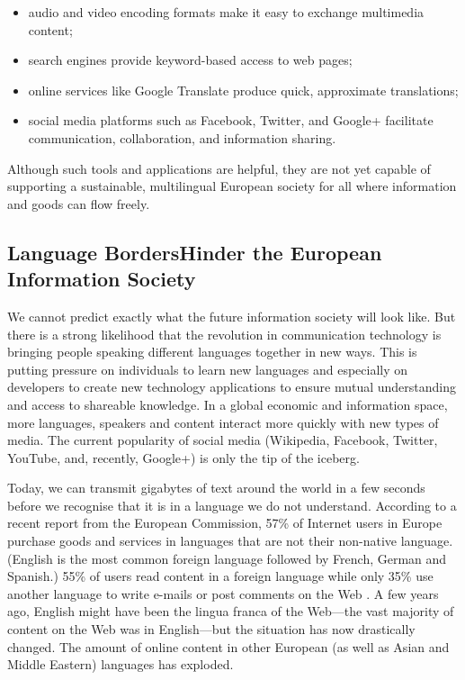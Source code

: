 \begin{multicols}{2}
\begin{itemize}
      \item audio and video encoding formats make it easy to exchange multimedia content;
      \item search engines provide keyword-based access to web pages;
      \item online services like Google Translate produce quick, approximate translations;
      \item social media platforms such as Facebook, Twitter, and Google+ facilitate communication, collaboration, and information sharing.
    \end{itemize}
    Although such tools and applications are helpful, they are not yet capable of supporting a sustainable, multilingual European society for all where information and goods can flow freely.

\subsection[Language Borders Hinder the European Information Society]{Language Borders\newline Hinder the European Information Society}

    We cannot predict exactly what the future information society will look like. But there is a strong likelihood that the revolution in communication technology is bringing people speaking different languages together in new ways. This is putting pressure on individuals to learn new languages and especially on developers to create new technology applications to ensure mutual understanding and access to shareable knowledge. In a global economic and information space, more languages, speakers and content interact more quickly with new types of media. The current popularity of social media (Wikipedia, Facebook, Twitter, YouTube, and, recently, Google+) is only the tip of the iceberg.


    Today, we can transmit gigabytes of text around the world in a few seconds before we recognise that it is in a language we do not understand. According to a recent report from the European Commission, 57\% of Internet users in Europe purchase goods and services in languages that are not their non-native language. (English is the most common foreign language followed by French, German and Spanish.) 55\% of users read content in a foreign language while only 35\% use another language to write e-mails or post comments on the Web \cite{CAT-Nota1}. A few years ago, English might have been the lingua franca of the Web—the vast majority of content on the Web was in English—but the situation has now drastically changed. The amount of online content in other European (as well as Asian and Middle Eastern) languages has exploded.


\end{multicols}
